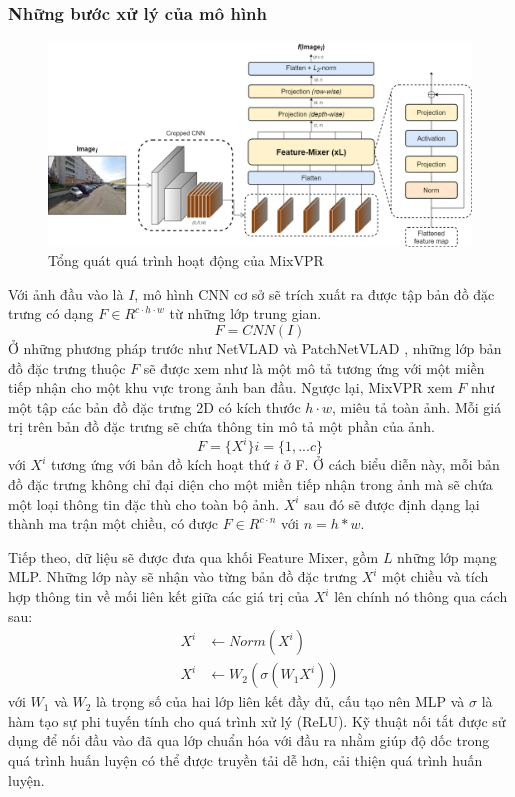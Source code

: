 \subsubsection*{Những bước xử lý của mô hình}
\begin{figure}[H]
    \centering
    \includegraphics[width=\textwidth]{pics/Proposal/mixvpr.png}
    \caption{Tổng quát quá trình hoạt động của MixVPR \cite{alibey2023mixvpr}}
\end{figure}
Với ảnh đầu vào là $I$, mô hình CNN cơ sở sẽ trích xuất ra được tập bản đồ đặc trưng có dạng $F \in R^{c \cdot h \cdot w}$ từ những lớp trung gian.
$$
F = CNN(I)
$$
Ở những phương pháp trước như NetVLAD \cite{arandjelovic2016netvlad} và PatchNetVLAD \cite{hausler2021patchnetvlad}, những lớp bản đồ đặc trưng thuộc $F$ sẽ được xem như là một mô tả tương ứng với một miền tiếp nhận cho một khu vực trong ảnh ban đầu. Ngược lại, MixVPR xem $F$ như một tập các bản đồ đặc trưng 2D có kích thước $h \cdot w$, miêu tả toàn ảnh. Mỗi giá trị trên bản đồ đặc trưng sẽ chứa thông tin mô tả một phần của ảnh.
$$
F = \{X^{i}\}    i = \{1,...c\}
$$
với $X^{i}$ tương ứng với bản đồ kích hoạt thứ $i$ ở F. Ở cách biểu diễn này, mỗi bản đồ đặc trưng không chỉ đại diện cho một miền tiếp nhận trong ảnh mà sẽ chứa một loại thông tin đặc thù cho toàn bộ ảnh. $X^{i}$ sau đó sẽ được định dạng lại thành ma trận một chiều, có được $F \in R^{c \cdot n}$ với $n = h*w$.

Tiếp theo, dữ liệu sẽ được đưa qua khối Feature Mixer, gồm $L$ những lớp mạng MLP. Những lớp này sẽ nhận vào từng bản đồ đặc trưng $X^{i}$ một chiều và tích hợp thông tin về mối liên kết giữa các giá trị của $X^{i}$ lên chính nó thông qua cách sau:
$$
\begin{aligned}
    X^{i} & \leftarrow Norm(X^{i}) \\
    X^{i} & \leftarrow W_2(\sigma(W_1 X^{i}))
\end{aligned}
$$
với $W_1$ và $W_2$ là trọng số của hai lớp liên kết đầy đủ, cấu tạo nên MLP và $\sigma$ là hàm tạo sự phi tuyến tính cho quá trình xử lý (ReLU). Kỹ thuật nối tắt được sử dụng để nối đầu vào đã qua lớp chuẩn hóa với đầu ra nhằm giúp độ dốc trong quá trình huấn luyện có thể được truyền tải dễ hơn, cải thiện quá trình huấn luyện.

